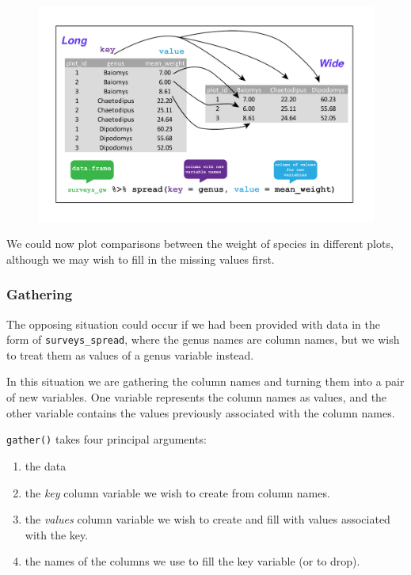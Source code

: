 \documentclass[]{book}
\newenvironment{Shaded}{\begin{snugshade}}{\end{snugshade}}
\newcommand{\KeywordTok}[1]{\textcolor[rgb]{0.13,0.29,0.53}{\textbf{#1}}}
\newcommand{\DataTypeTok}[1]{\textcolor[rgb]{0.13,0.29,0.53}{#1}}
\newcommand{\DecValTok}[1]{\textcolor[rgb]{0.00,0.00,0.81}{#1}}
\newcommand{\StringTok}[1]{\textcolor[rgb]{0.31,0.60,0.02}{#1}}
\newcommand{\OperatorTok}[1]{\textcolor[rgb]{0.81,0.36,0.00}{\textbf{#1}}}
\newcommand{\NormalTok}[1]{#1}
\providecommand{\tightlist}{%
  \setlength{\itemsep}{0pt}\setlength{\parskip}{0pt}}
\begin{document}
\begin{figure}
\centering
\includegraphics{img/spread_data_R.png}
\caption{}
\end{figure}

We could now plot comparisons between the weight of species in different
plots, although we may wish to fill in the missing values first.

\begin{Shaded}
\end{Shaded}

\subsubsection{Gathering}\label{gathering}

The opposing situation could occur if we had been provided with data in
the form of \texttt{surveys\_spread}, where the genus names are column
names, but we wish to treat them as values of a genus variable instead.

In this situation we are gathering the column names and turning them
into a pair of new variables. One variable represents the column names
as values, and the other variable contains the values previously
associated with the column names.

\texttt{gather()} takes four principal arguments:

\begin{enumerate}
\def\labelenumi{\arabic{enumi}.}
\tightlist
\item
  the data
\item
  the \emph{key} column variable we wish to create from column names.
\item
  the \emph{values} column variable we wish to create and fill with
  values associated with the key.
\item
  the names of the columns we use to fill the key variable (or to drop).
\end{enumerate}
\end{document}
